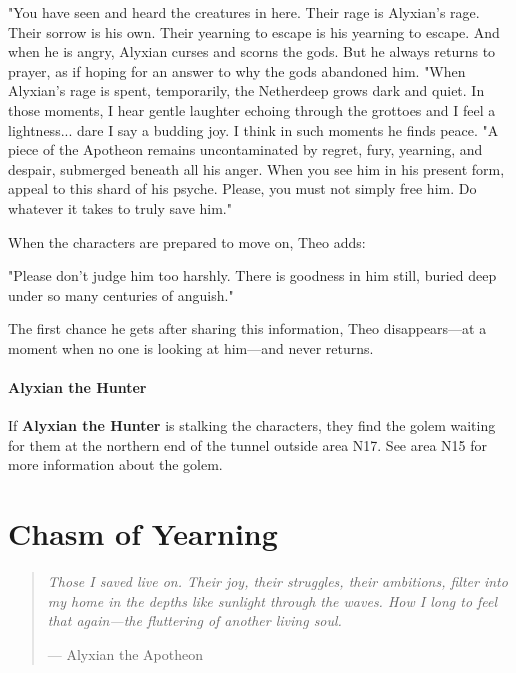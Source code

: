 \documentclass[a4paper, 11pt, bg=full, twocolumn, nooutline]{dndbook}
\begin{document}
\begin{DndReadAloud}
"You have seen and heard the creatures in here. Their rage is Alyxian's rage. Their sorrow is his own. Their yearning to escape is his yearning to escape. And when he is angry, Alyxian curses and scorns the gods. But he always returns to prayer, as if hoping for an answer to why the gods abandoned him.
"When Alyxian's rage is spent, temporarily, the Netherdeep grows dark and quiet. In those moments, I hear gentle laughter echoing through the grottoes and I feel a lightness... dare I say a budding joy. I think in such moments he finds peace.
"A piece of the Apotheon remains uncontaminated by regret, fury, yearning, and despair, submerged beneath all his anger. When you see him in his present form, appeal to this shard of his psyche. Please, you must not simply free him. Do whatever it takes to truly save him."
\end{DndReadAloud}

When the characters are prepared to move on, Theo adds:

\begin{DndReadAloud}
"Please don't judge him too harshly. There is goodness in him still, buried deep under so many centuries of anguish."
\end{DndReadAloud}

The first chance he gets after sharing this information, Theo disappears---at a moment when no one is looking at him---and never returns.

\paragraph{Alyxian the Hunter}

If \textbf{Alyxian the Hunter} is stalking the characters, they find the golem waiting for them at the northern end of the tunnel outside area N17. See area N15 for more information about the golem.
\section{Chasm of Yearning}

\begin{quotation}
\em
Those I saved live on. Their joy, their struggles, their ambitions, filter into my home in the depths like sunlight through the waves. How I long to feel that again---the fluttering of another living soul.

\hfill --- Alyxian the Apotheon
\end{quotation}
\end{document}
